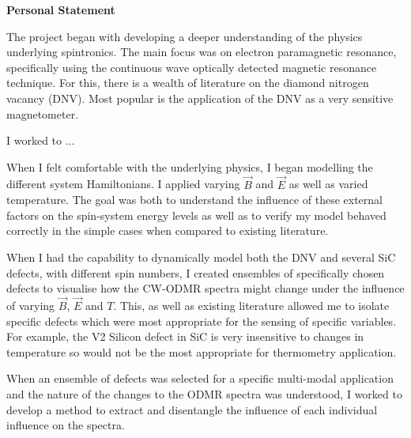 \vspace*{\fill}
\begin{center}
\textrm{\bfseries\Huge Personal Statement}%
\end{center}%

\vspace{1em}

%
The project began with developing a deeper understanding of the physics underlying spintronics. 
The main focus was on electron paramagnetic resonance, specifically using the continuous wave optically detected magnetic resonance technique. For this, there is a wealth of literature on the diamond nitrogen vacancy (DNV). Most popular is the application of the DNV as a very sensitive magnetometer. 

I worked to ... 

When I felt comfortable with the underlying physics, I began modelling the different system Hamiltonians. I applied varying $\vec{B}$ and $\vec{E}$ as well as varied temperature. The goal was both to understand the influence of these external factors on the spin-system energy levels as well as to verify my model behaved correctly in the simple cases when compared to existing literature. 

When I had the capability to dynamically model both the DNV and several SiC defects, with different spin numbers, I created ensembles of specifically chosen defects to visualise how the CW-ODMR spectra might change under the influence of varying $\vec{B}$, $\vec{E}$ and $T$. This, as well as existing literature allowed me to isolate specific defects which were most appropriate for the sensing of specific variables. 
For example, the V2 Silicon defect in SiC is very insensitive to changes in temperature so would not be the most appropriate for thermometry application. 

When an ensemble of defects was selected for a specific multi-modal application and the nature of the changes to the ODMR spectra was understood, I worked to develop a method to extract and disentangle the influence of each individual influence on the spectra. 

